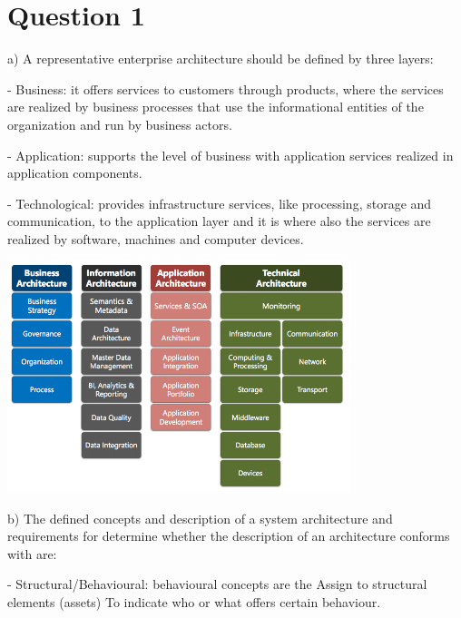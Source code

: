 \documentclass[a4paper,12pt]{texDoc}
\begin{document}
\maketitle %


\section*{Question 1}

a) A representative enterprise architecture should be defined \cite{eaFundamentals} by three layers:

- Business: it offers services to customers through products, where the services are realized by business processes that use the informational entities of the organization and run by business actors.

- Application: supports the level of business with application services realized in application components.

- Technological: provides infrastructure services, like processing, storage and communication, to the application layer and it is where also the services are realized by software, machines and computer devices.

\begin{center}
\includegraphics[width=0.75\textwidth]{concepts.png}
\end{center}

b) The defined concepts and description of a system architecture and requirements for determine whether the description of an architecture conforms with are:

- Structural/Behavioural: behavioural concepts are the Assign to structural elements (assets) To indicate who or what offers certain behaviour.
\end{document}
